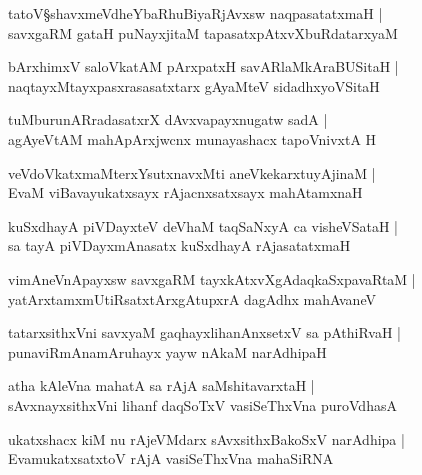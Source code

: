 \begin{shloka}
tatoV\S shavxmeVdheYbaRhuBiyaRjAvxsw naqpasatatxmaH |\\
savxgaRM gataH puNayxjitaM tapasatxpAtxvXbuRdatarxyaM 
\end{shloka}

\begin{shloka}
bArxhimxV saloVkatAM pArxpatxH savARlaMkAraBUSitaH |\\
naqtayxMtayxpasxrasasatxtarx gAyaMteV sidadhxyoVSitaH
\end{shloka}

\begin{shloka}
tuMburunARradasatxrX dAvxvapayxnugatw sadA |\\
agAyeVtAM mahApArxjwcnx munayashacx tapoVnivxtA H
\end{shloka}

\begin{shloka}
veVdoVkatxmaMterxYsutxnavxMti aneVkekarxtuyAjinaM |\\
EvaM viBavayukatxsayx rAjacnxsatxsayx mahAtamxnaH 
\end{shloka}

\begin{shloka}
kuSxdhayA piVDayxteV deVhaM taqSaNxyA ca visheVSataH |\\
sa tayA piVDayxmAnasatx kuSxdhayA rAjasatatxmaH 
\end{shloka}

\begin{shloka}
vimAneVnApayxsw savxgaRM tayxkAtxvXgAdaqkaSxpavaRtaM |\\
yatArxtamxmUtiRsatxtArxgAtupxrA dagAdhx mahAvaneV 
\end{shloka}

\begin{shloka}
tatarxsithxVni savxyaM gaqhayxlihanAnxsetxV sa pAthiRvaH |\\
punaviRmAnamAruhayx yayw nAkaM narAdhipaH 
\end{shloka}

\begin{shloka}
atha kAleVna mahatA sa rAjA saMshitavarxtaH |\\
sAvxnayxsithxVni lihanf daqSoTxV vasiSeThxVna puroVdhasA
\end{shloka}

\begin{shloka}
ukatxshacx kiM nu rAjeVMdarx sAvxsithxBakoSxV narAdhipa |\\
EvamukatxsatxtoV rAjA vasiSeThxVna mahaSiRNA
\end{shloka}

